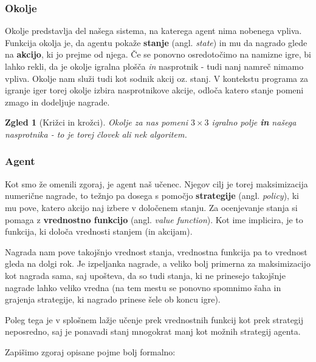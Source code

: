 \documentclass[12pt,a4paper]{amsart}
\theoremstyle{definition} %
\theoremstyle{plain} %
\newtheorem{zgled}[definicija]{Zgled}
\begin{document}
\subsubsection{Okolje}
Okolje predstavlja del našega sistema, na katerega agent nima nobenega vpliva. Funkcija okolja
je, da agentu pokaže \textbf{stanje} (angl. \textit{state}) in mu da nagrado glede na 
\textbf{akcijo}, ki jo prejme od njega. Če se ponovno osredotočimo na namizne igre, bi lahko rekli, 
da je okolje igralna plošča \textit{in} nasprotnik  - tudi nanj namreč nimamo vpliva. Okolje nam 
služi tudi kot sodnik akcij oz. stanj. V kontekstu programa za igranje iger torej okolje izbira 
nasprotnikove akcije, odloča katero stanje pomeni zmago in dodeljuje nagrade.

\begin{zgled}[Križci in krožci]
    Okolje za nas pomeni $3\times3$ igralno polje \textbf{in} našega nasprotnika - to je torej človek 
    ali nek algoritem.
\end{zgled}

\subsubsection{Agent}
Kot smo že omenili zgoraj, je agent naš učenec. Njegov cilj je torej maksimizacija numerične 
nagrade, to težnjo pa dosega s pomočjo \textbf{strategije} (angl. \textit{policy}), ki mu pove, 
katero akcijo naj izbere v določenem stanju. Za ocenjevanje stanja si pomaga z \textbf{vrednostno 
funkcijo} (angl. \textit{value function}). Kot ime implicira, je to funkcija, ki določa vrednosti 
stanjem (in akcijam). 

Nagrada nam pove takojšnjo vrednost stanja, vrednostna funkcija pa to vrednost gleda na dolgi
rok. Je izpeljanka nagrade, a veliko bolj primerna za maksimizacijo kot nagrada sama, saj upošteva,
da so tudi stanja, ki ne prinesejo takojšnje nagrade lahko veliko vredna (na tem mestu se ponovno 
spomnimo šaha in grajenja strategije, ki nagrado prinese šele ob koncu igre).

Poleg tega je v splošnem lažje učenje prek vrednostnih funkcij kot prek strategij neposredno, 
saj je ponavadi stanj mnogokrat manj kot možnih strategij agenta.

Zapišimo zgoraj opisane pojme bolj formalno:
\end{document}
